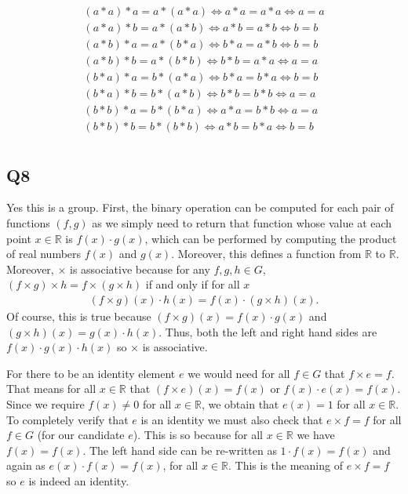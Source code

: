 \documentclass[12pt]{article}
\def\R{{\mathbb R}}        %
\numberwithin{theorem}{section}
\numberwithin{equation}{section}
\numberwithin{remark}{section}
\numberwithin{definition}{section}
\numberwithin{theorem}{section}
\numberwithin{lemma}{section}
\numberwithin{example}{section}
\begin{document}
\begin{align*}
	(a*a)*a=a*(a*a) \iff a*a=a*a \iff a = a\\
	(a*a)*b=a*(a*b) \iff a*b=a*b \iff b = b\\
	(a*b)*a=a*(b*a) \iff b*a=a*b \iff b = b\\
	(a*b)*b=a*(b*b) \iff b*b=a*a \iff a = a\\
	(b*a)*a=b*(a*a) \iff b*a=b*a \iff b = b\\
	(b*a)*b=b*(a*b) \iff b*b=b*b \iff a = a\\
	(b*b)*a=b*(b*a) \iff a*a=b*b \iff a = a\\
	(b*b)*b=b*(b*b) \iff a*b=b*a \iff b = b\\
\end{align*}



\subsection{Q8}

Yes this is a group. First, the binary operation can be computed for each pair of functions $(f,g)$ as we simply need to return that function whose value at each point $x\in \R$ is $f(x)\cdot g(x)$, which can be performed by computing the product of real numbers $f(x)$ and $g(x)$. Moreover, this defines a function from $\R$ to $\R$. Moreover, $\times$ is associative because for any $f,g,h\in G$, $(f\times g)\times h=f\times(g\times h)$ if and only if for all $x$ 
\begin{align*}
	(f\times g)(x)\cdot h(x) = f(x)\cdot (g\times h)(x). 
\end{align*}
Of course, this is true because $(f\times g)(x)=f(x)\cdot g(x)$ and $(g\times h)(x)=g(x)\cdot h(x)$. Thus, both the left and right hand sides are $f(x)\cdot g(x) \cdot h(x)$ so $\times$ is associative. 

For there to be an identity element $e$ we would need for all $f\in G$ that $f\times e = f$. That means for all $x\in \R$ that $(f\times e)(x)=f(x)$ or $f(x)\cdot e(x)=f(x)$. Since we require $f(x)\neq 0$ for all $x\in\R$, we obtain that $e(x)=1$ for all $x\in\R$. To completely verify that $e$ is an identity we must also check that $e\times f = f$ for all $f\in G$ (for our candidate $e$). This is so because for all $x\in \R$ we have $f(x)=f(x)$. The left hand side can be re-written as $1\cdot f(x)=f(x)$ and again as $e(x)\cdot f(x)=f(x)$, for all $x\in \R$. This is the meaning of $e\times f = f$ so $e$ is indeed an identity. 
\end{document}
